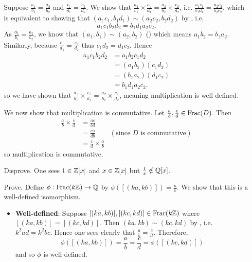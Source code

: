 \begin{questions}
    \item Suppose $\frac{a_1}{b_1} = \frac{a_2}{b_2}$ and $\frac{c_1}{d_1} = \frac{c_2}{d_2}$. We show that $\frac{a_1}{b_1} \times \frac{c_1}{d_1} = \frac{a_2}{b_2} \times \frac{c_2}{d_2}$, i.e. $\frac{a_1c_1}{b_1d_1} = \frac{a_2c_2}{b_2c_2}$, which is equivalent to showing that $(a_1c_1, b_1d_1) \mathrel{\sim} (a_2c_2, b_2d_2)$ by , i.e.
    \[
        a_1c_1b_2d_2 = b_1d_1a_2c_2.
    \]
    As $\frac{a_1}{b_1} = \frac{a_2}{b_2}$, we know that $(a_1, b_1) \mathrel{\sim} (a_2, b_2)$ () which means $a_1b_2 = b_1a_2$. Similarly, because $\frac{c_1}{d_1} = \frac{c_2}{d_2}$ thus $c_1d_2 = d_1c_2$. Hence
    \begin{align*}
        a_1c_1b_2d_2 &= a_1b_2c_1d_2\\
        &= (a_1b_2)(c_1d_2)\\
        &= (b_1a_2)(d_1c_2)\\
        &= b_1d_1a_2c_2.
    \end{align*}
    so we have shown that $\frac{a_1}{b_1} \times \frac{c_1}{d_1} = \frac{a_2}{b_2} \times \frac{c_2}{d_2}$, meaning multiplication is well-defined.

    We now show that multiplication is commutative. Let $\frac ab, \frac cd \in \mathrm{Frac}(D)$. Then
    \begin{align*}
        \frac ab \times \frac cd &= \frac{ac}{bd}\\
        &= \frac{ca}{db} & (\text{since } D \text{ is commutative})\\
        &= \frac cd \times \frac ab
    \end{align*}
    so multiplication is commutative.

    \item \begin{partquestions}{\alph*}
        \item Disprove. One sees $1 \in \mathbb{Z}[x]$ and $x \in \mathbb{Z}[x]$ but $\frac1x \notin \mathbb{Q}[x]$.

        \item Prove. Define $\phi: \mathrm{Frac}(k\mathbb{Z}) \to \mathbb{Q}$ by $\phi([(ka, kb)]) = \frac ab$. We show that this is a well-defined isomorphism.
        \begin{itemize}
            \item \textbf{Well-defined}: Suppose $[(ka, kb)], [(kc, kd)] \in \mathrm{Frac}(k\mathbb{Z})$ where $[(ka,kb)]=[(kc,kd)]$. Then $(ka, kb) \mathrel{\sim} (kc, kd)$ by , i.e. $k^2ad = k^2bc$. Hence one sees clearly that $\frac ab = \frac cd$. Therefore,
            \[
                \phi([(ka,kb)]) = \frac ab = \frac cd = \phi([(kc, kd)])
            \]
            and so $\phi$ is well-defined.


\end{itemize}
\end{partquestions}
\end{questions}
